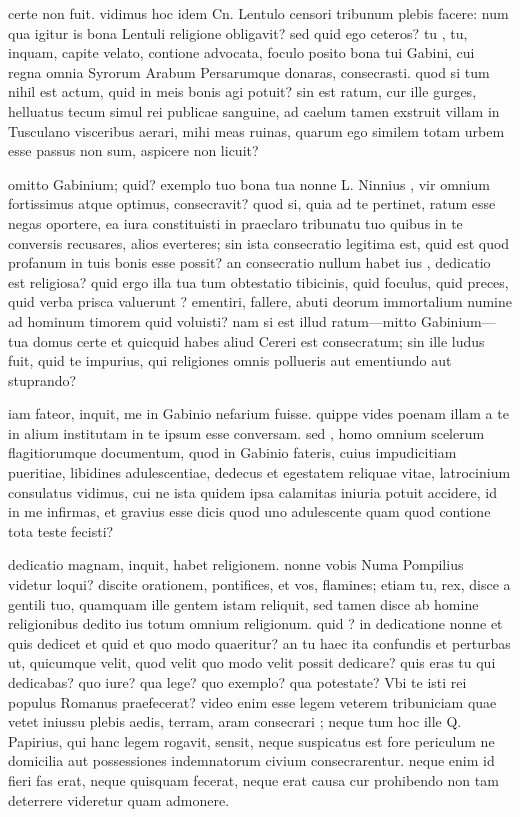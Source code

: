  certe non fuit. vidimus hoc idem Cn. Lentulo censori tribunum plebis facere: num qua igitur is bona Lentuli religione obligavit? sed quid ego ceteros? tu , tu, inquam, capite velato, contione advocata, foculo posito bona tui Gabini, cui regna omnia Syrorum Arabum Persarumque donaras, consecrasti. quod si tum nihil est actum, quid in meis bonis agi potuit? sin est ratum, cur ille gurges, helluatus tecum simul rei publicae sanguine, ad caelum tamen exstruit villam in Tusculano visceribus aerari, mihi meas ruinas, quarum ego similem totam urbem esse passus non sum, aspicere non licuit?

 omitto Gabinium; quid? exemplo tuo bona tua nonne L. Ninnius , vir omnium fortissimus atque optimus, consecravit? quod si, quia ad te pertinet, ratum esse negas oportere, ea iura constituisti in praeclaro tribunatu tuo quibus in te conversis recusares, alios everteres; sin ista consecratio legitima est, quid est quod profanum in tuis bonis esse possit? an consecratio nullum habet ius , dedicatio est religiosa? quid ergo illa tua tum obtestatio tibicinis, quid foculus, quid preces, quid verba prisca valuerunt ? ementiri, fallere, abuti deorum immortalium numine ad hominum timorem quid voluisti? nam si est illud ratum—mitto Gabinium—tua domus certe et quicquid habes aliud Cereri est consecratum; sin ille ludus fuit, quid te impurius, qui religiones omnis pollueris aut ementiundo aut stuprando?

 iam fateor, inquit, me in Gabinio nefarium fuisse. quippe vides poenam illam a te in alium institutam in te ipsum esse conversam. sed , homo omnium scelerum flagitiorumque documentum, quod in Gabinio fateris, cuius impudicitiam pueritiae, libidines adulescentiae, dedecus et egestatem reliquae vitae, latrocinium consulatus vidimus, cui ne ista quidem ipsa calamitas iniuria potuit accidere, id in me infirmas, et gravius esse dicis quod uno adulescente quam quod contione tota teste fecisti?

 dedicatio magnam, inquit, habet religionem. nonne vobis Numa Pompilius videtur loqui? discite orationem, pontifices, et vos, flamines; etiam tu, rex, disce a gentili tuo, quamquam ille gentem istam reliquit, sed tamen disce ab homine religionibus dedito ius totum omnium religionum. quid ? in dedicatione nonne et quis dedicet et quid et quo modo quaeritur? an tu haec ita confundis et perturbas ut, quicumque velit, quod velit quo modo velit possit dedicare? quis eras tu qui dedicabas? quo iure? qua lege? quo exemplo? qua potestate? Vbi te isti rei populus Romanus praefecerat? video enim esse legem veterem tribuniciam quae vetet iniussu plebis aedis, terram, aram consecrari ; neque tum hoc ille Q. Papirius, qui hanc legem rogavit, sensit, neque suspicatus est fore periculum ne domicilia aut possessiones indemnatorum civium consecrarentur. neque enim id fieri fas erat, neque quisquam fecerat, neque erat causa cur prohibendo non tam deterrere videretur quam admonere.

